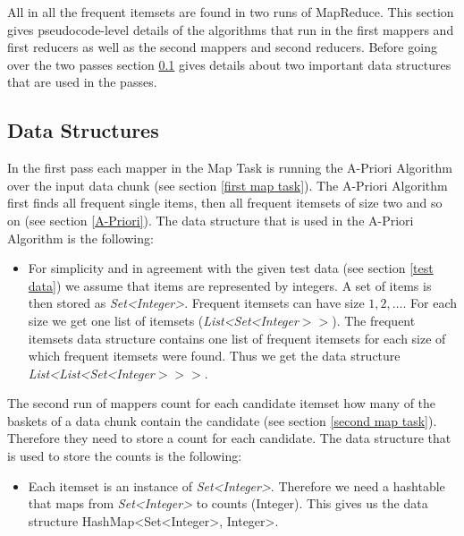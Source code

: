 All in all the frequent itemsets are found in two runs of MapReduce. This section gives pseudocode-level details of the algorithms that run in the first mappers and first reducers as well as the second mappers and second reducers. Before going over the two passes section \ref{data structures} gives details about two important data structures that are used in the passes.
\subsection{Data Structures}\label{data structures}
In the first pass each mapper in the Map Task is running the A-Priori Algorithm over the input data chunk (see section \ref{first map task}). The A-Priori Algorithm first finds all frequent single items, then all frequent itemsets of size two and so on (see section \ref{A-Priori}). The data structure that is used in the A-Priori Algorithm is the following:
\begin{itemize}
\item For simplicity and in agreement with the given test data (see section \ref{test data}) we assume that items are represented by integers. A set of items is then stored as \textit{Set<Integer>}. Frequent itemsets can have size $1,2,\hdots$. For each size we get one list of itemsets (\textit{List<Set<Integer$>>$}). The frequent itemsets data structure contains one list of frequent itemsets for each size of which frequent itemsets were found. Thus we get the data structure \textit{List<List<Set<Integer$>>>$}.
\end{itemize}

The second run of mappers count for each candidate itemset how many of the baskets of a data chunk contain the candidate (see section \ref{second map task}). Therefore they need to store a count for each candidate. The data structure that is used to store the counts is the following:
\begin{itemize}
\item Each itemset is an instance of \textit{Set<Integer>}. Therefore we need a hashtable that maps from \textit{Set<Integer>} to counts (Integer). This gives us the data structure HashMap<Set<Integer>, Integer>.
\end{itemize}
